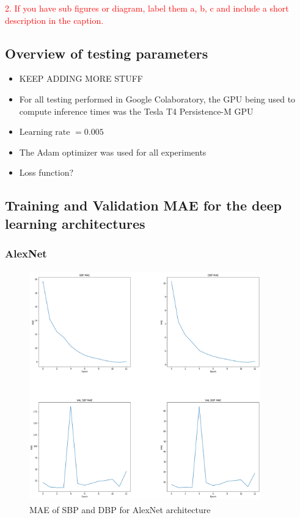 \textcolor{red}{2. If you have sub figures or diagram, label them a, b, c and include a short description in the caption.}


\subsection{Overview of testing parameters}

\begin{itemize}
    \item KEEP ADDING MORE STUFF
    \item For all testing performed in Google Colaboratory, the GPU being used to compute
    inference times was the Tesla T4 Persistence-M GPU
    \item $\text{Learning rate } = 0.005$
    \item The Adam optimizer was used for all experiments
    \item Loss function?
\end{itemize}

\subsection{Training and Validation MAE for the deep learning architectures}

\subsubsection{AlexNet}

\begin{figure}[H]
    \centering
    \includegraphics[width=10cm,height=10cm,keepaspectratio]{Results/alexnet.png}
    \caption{MAE of SBP and DBP for AlexNet architecture}
    \label{alexnetResults}
\end{figure}

